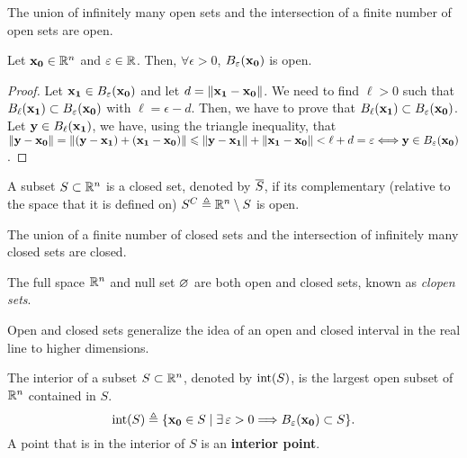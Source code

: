 \begin{prop}
The union of infinitely many open sets and the intersection of a finite number of open sets are open.
\end{prop}

\begin{prop}
    Let $\vec{x_0}\in\Rtn$ and $\epsilon\in\R$. Then, $\forall\epsilon > 0$, $\oball{\epsilon}{\vec{x_0}}$ is open.
\end{prop}

\begin{proof}
    Let $\vec{x_1}\in\oball{\epsilon}{\vec{x_0}}$ and let $d = \left\Vert \mathbf{x_1} - \mathbf{x_0} \right\Vert$. We need to find $\ell > 0$
    such that $\oball{\ell}{\vec{x_1}}\subset\oball{\epsilon}{\vec{x_0}}$ with $\ell = \epsilon - d$. Then, we have to
    prove that $\oball{\ell}{\vec{x_1}}\subset\oball{\epsilon}{\vec{x_0}}$. Let $\vec{y}\in\oball{\ell}{\vec{x_1}}$, we have,
    using the triangle inequality,
    that $\vnorm{\vec{y} - \vec{x_0}} = \vnorm{(\vec{y} - \vec{x_1}) + (\vec{x_1} - \vec{x_0})}\leq\vnorm{\vec{y} - 
    \vec{x_1}} + \vnorm{\vec{x_1} - \vec{x_0}} < \ell + d = \epsilon\iff\vec{y}\in\oball{\epsilon}{\vec{x_0}}$. 
\end{proof}

\begin{defn}\label{def:closed-set}
    A subset $S\subset\Rtn$ is a closed set, denoted by $\overline{S}$, if its complementary (relative to the space that 
    it is defined on) $S^C \bydef\Rtn\setminus S$ is open. 
\end{defn}

\begin{prop}
The union of a finite number of closed sets and the intersection of infinitely many closed sets are closed.
\end{prop}

\begin{prop}
    The full space $\Rtn$ and null set $\O$ are both open and closed sets, known as \textit{clopen sets}.
\end{prop}

Open and closed sets generalize the idea of an open and closed interval in the real line to higher dimensions.

\begin{defn}[Interior]
	The interior of a subset $S\subset\Rtn$, denoted by $\interior{S}$, is the largest open subset of $\Rtn$ contained in $S$. 
	\begin{equation}
		\interior{S}\bydef\{\vec{x_0}\in S\st\exists\epsilon > 0\implies B_\epsilon\argopen(\vec{x_0}\argclose)\subset S\}.
	\end{equation}
        A point that is in the interior of $S$ is an \textbf{interior point}.
\end{defn}

